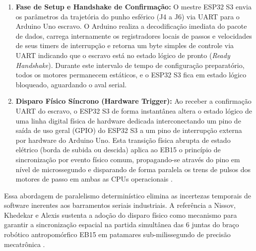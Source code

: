\begin{enumerate}
    \item \textbf{Fase de Setup e Handshake de Confirmação:} O mestre ESP32 S3 envia os parâmetros da trajetória do punho esférico (J4 a J6) via UART para o Arduino Uno escravo. O Arduino realiza a decodificação imediata do pacote de dados, carrega internamente os registradores locais de passos e velocidades de seus timers de interrupção e retorna um byte simples de controle via UART indicando que o escravo está no estado lógico de pronto (\textit{Ready Handshake}). Durante este intervalo de tempo de configuração preparatório, todos os motores permanecem estáticos, e o ESP32 S3 fica em estado lógico bloqueado, aguardando o aval serial.
    
    \item \textbf{Disparo Físico Síncrono (Hardware Trigger):} Ao receber a confirmação UART do escravo, o ESP32 S3 de forma instantânea altera o estado lógico de uma linha digital física de hardware dedicada interconectando um pino de saída de uso geral (GPIO) do ESP32 S3 a um pino de interrupção externa por hardware do Arduino Uno. Esta transição física abrupta de estado elétrico (borda de subida ou descida) aplica ao EB15 o princípio de sincronização por evento físico comum, propagando-se através do pino em nível de microssegundo e disparando de forma paralela os trens de pulsos dos motores de passo em ambas as CPUs operacionais \cite{nissov2025simultaneous}.
\end{enumerate}

Essa abordagem de paralelismo determinístico elimina as incertezas temporais de software inerentes aos barramentos seriais industriais. A referência a Nissov, Khedekar e Alexis sustenta a adoção do disparo físico como mecanismo para garantir a sincronização espacial na partida simultânea das 6 juntas do braço robótico antropomórfico EB15 em patamares sub-milissegundo de precisão mecatrônica \cite{nissov2025simultaneous}.
